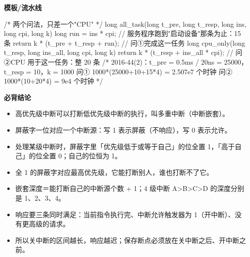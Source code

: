 \documentclass[10pt,a4paper]{ctexart}
\begin{document}
\textbf{模板/流水线}

\begin{codebox}
/* 两个问法，只差一个"CPU" */
long all_task(long t_pre, long t_resp, long ins, long cpi, long k) {
    long run = ins * cpi;                  // 服务程序跑到"启动设备"那条为止：15 条
    return k * (t_pre + t_resp + run);     // 问①完成这一任务
}
long cpu_only(long t_resp, long ins_all, long cpi, long k) {
    return k * (t_resp + ins_all * cpi);   // 问②CPU 用于这一任务：整 20 条
}
/* 2016-44(2)：t_pre = 0.5ms / 20ns = 25000，t_resp = 10，k = 1000
   问① 1000*(25000+10+15*4) = 2.507e7 个时钟
   问② 1000*(10+20*4)       = 9e4   个时钟  */
\end{codebox}





\textbf{必背结论}

\begin{itemize}

\item 高优先级中断可以打断低优先级中断的执行，叫多重中断（中断嵌套）。

\item 屏蔽字一位对应一个中断源：写 1 表示屏蔽（不响应），写 0 表示允许。

\item 处理某级中断时，屏蔽字里「优先级低于或等于自己」的位全置 1，「高于自己」的位全置 0；自己的位恒为 1。

\item 全 1 的屏蔽字对应最高优先级，它能打断别人，谁也打断不了它。

\item 嵌套深度＝能打断自己的中断源个数 + 1；4 级中断 A>B>C>D 的深度分别是 1、2、3、4。

\item 响应要三条同时满足：当前指令执行完、中断允许触发器为 1（开中断）、没有更高级的请求。

\item 所以关中断的区间越长，响应越迟；保存断点必须放在关中断之后、开中断之前。

\end{itemize}
\end{document}
